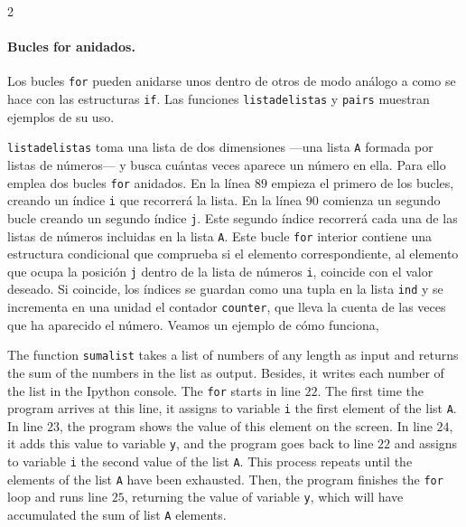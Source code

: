 \begin{paracol}{2}
\paragraph{Bucles for anidados.}  Los bucles \texttt{for} pueden anidarse unos dentro de otros de modo análogo a como se hace con las estructuras \texttt{if}. Las funciones \texttt{listadelistas} y \texttt{pairs} muestran ejemplos de su uso.

\texttt{listadelistas} toma una lista de dos dimensiones ---una lista \texttt{A} formada por listas de números--- y busca cuántas veces aparece un número en ella. Para ello emplea dos bucles \texttt{for} anidados. En la línea $89$ empieza el primero de los bucles, creando un índice \texttt{i} que recorrerá la lista. En la línea $90$ comienza un segundo bucle creando un segundo índice \texttt{j}. Este segundo índice recorrerá cada una de las listas de números incluidas en la lista \texttt{A}. Este bucle \texttt{for} interior contiene una estructura condicional que comprueba si el elemento correspondiente, al elemento que ocupa la posición \texttt{j} dentro de la lista de números \texttt{i}, coincide con el valor deseado. Si coincide, los índices se guardan como una tupla en la lista \texttt{ind} y se incrementa en una unidad el contador \texttt{counter}, que lleva la cuenta de las veces que ha aparecido el número. Veamos un ejemplo de cómo funciona,

\switchcolumn

The function \texttt{sumalist} takes a list of numbers of any length as input and returns the sum of the numbers in the list as output. Besides, it writes each number of the list in the Ipython console. The \texttt{for} starts in line $22$. The first time the program arrives at this line, it assigns to variable \texttt{i} the first element of the list \texttt{A}. In line $23$, the program shows the value of this element on the screen. In line $24$, it adds this value to variable \texttt{y}, and the program goes back to line $22$ and assigns to variable \texttt{i} the second value of the list \texttt{A}. This process repeats until the elements of the list \texttt{A} have been exhausted. Then, the program finishes the \texttt{for} loop and runs line $25$, returning the value of variable \texttt{y}, which will have accumulated the sum of list \texttt{A} elements.


\end{paracol}
